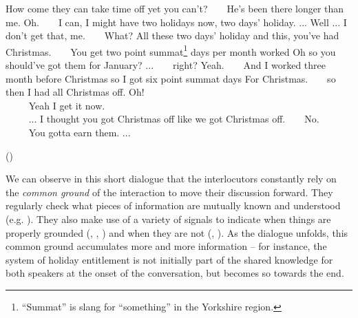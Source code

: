 \begin{dialogue} 
 How come they can take time off yet you can't?
 $\ \ \ \ \ \ $ He's been there longer than me.
 Oh.
  $\ \ \ \ \ \ $ I can, I might have two holidays now, two days' holiday. ...
 Well ... I don't get that, me.
  $\ \ \ \ \ \ $ What?
 All these two days' holiday and this, you've had Christmas.
  $\ \ \ \ \ \ $ You get two point summat\footnote{``Summat'' is slang for ``something'' in the Yorkshire region. } days per month worked
 Oh so you should've got them for January? ...
  $\ \ \ \ \ \ $ right?
 Yeah.
  $\ \ \ \ \ \ $ And I worked three month before Christmas so I got six point summat days
 For Christmas.
  $\ \ \ \ \ \ $ so then I had all Christmas off.
 Oh! \\
 $\phantom{a} \ \ \ \ \ \ \ $ Yeah I get it now. \\
 $\phantom{a} \ \ \ \ \ \ \ $ ... I thought you got Christmas off like we got Christmas off.
  $\ \ \ \ \ \ $ No. \\ 
 $\phantom{a} \ \ \ \ \ \ \ $ You gotta earn them. ... \vspace{-2mm}
 \begin{flushright}\begin{scriptsize}()\end{scriptsize}\end{flushright} 
\end{dialogue} 

We can observe in this short dialogue that the interlocutors constantly rely on the \textit{common ground} of the interaction to move their discussion forward.  They regularly check what pieces of information are mutually known and understood (e.g. ).  They also make use of a variety of signals to indicate when things are properly grounded (, , ) and when they are not (, ).  As the dialogue unfolds, this common ground accumulates more and more information -- for instance, the system of holiday entitlement is not initially part of the shared knowledge for both speakers at the onset of the conversation, but becomes so towards the end. 

